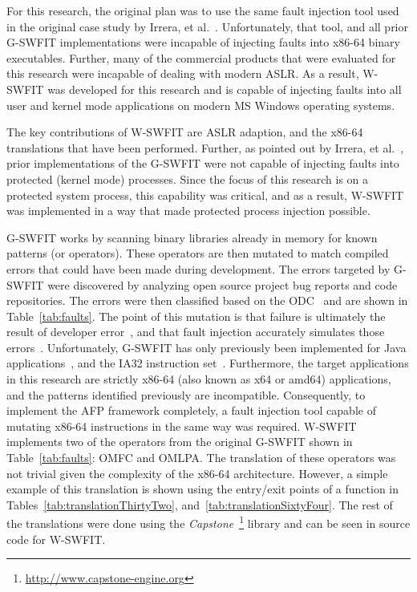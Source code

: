For this research, the original plan was to use the same fault injection tool
used in the original case study by Irrera, et al.~\cite{irrera2015}.
Unfortunately, that tool, and all prior \ac{G-SWFIT} implementations were
incapable of injecting faults into x86-64 binary executables.  Further, many of
the commercial products that were evaluated for this research were incapable of
dealing with modern \ac{ASLR}.  As a result, \ac{W-SWFIT} was developed for
this research and is capable of injecting faults into all user and kernel mode
applications on modern \ac{MS} Windows operating systems.  

The key contributions of \ac{W-SWFIT} are \ac{ASLR} adaption, and the x86-64
translations that have been performed.  Further, as pointed out by Irrera, et
al.~\cite{irrera2013a}, prior implementations of the \ac{G-SWFIT} were not
capable of injecting faults into protected (kernel mode) processes.  Since the
focus of this research is on a protected system process, this capability was
critical, and as a result, \ac{W-SWFIT} was implemented in a way that made
protected process injection possible.  

\ac{G-SWFIT} works by scanning binary libraries already in memory for known
patterns (or operators).  These operators are then mutated to match compiled
errors that could have been made during development.  The errors targeted by
\ac{G-SWFIT} were discovered by analyzing open source project bug reports and
code repositories.  The errors were then classified based on the
\ac{ODC}~\cite{bridge1998} and are shown in Table~\ref{tab:faults}.  The point
of this mutation is that failure is ultimately the result of developer
error~\cite{irrera2015,salfnerSurvey}, and that fault injection accurately
simulates those errors~\cite{gswfit}.  Unfortunately, \ac{G-SWFIT} has only
previously been implemented for Java
applications~\cite{martins2002jaca,sanches2011jswfit}, and the IA32 instruction
set~\cite{gswfit,natella2010}.  Furthermore, the target applications in this
research are strictly x86-64 (also known as x64 or amd64) applications, and the
patterns identified previously are incompatible.  Consequently, to implement
the \ac{AFP} framework completely, a fault injection tool capable of mutating
x86-64 instructions in the same way was required.  \ac{W-SWFIT} implements two
of the operators from the original \ac{G-SWFIT} shown in
Table~\ref{tab:faults}: OMFC and OMLPA.  The translation of these operators was
not trivial given the complexity of the x86-64 architecture.  However, a simple
example of this translation is shown using the entry/exit points of a function
in Tables~\ref{tab:translationThirtyTwo}, and~\ref{tab:translationSixtyFour}.
The rest of the translations were done using the
\emph{Capstone}~\footnote{\url{http://www.capstone-engine.org}} library and can
be seen in source code for \ac{W-SWFIT}.

